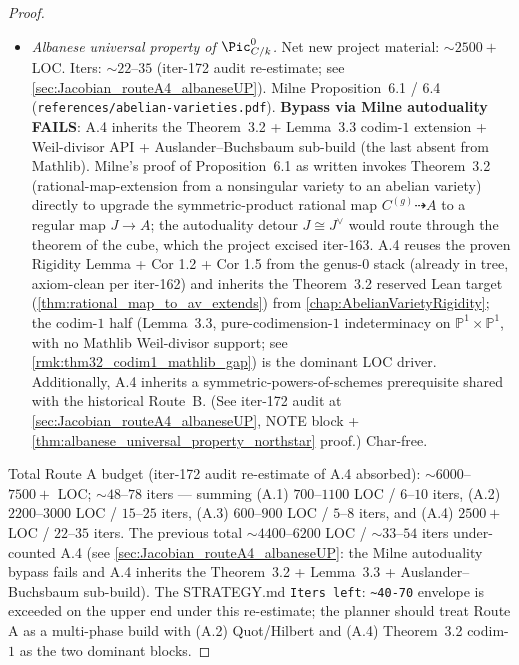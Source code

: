 \begin{proof}
\begin{itemize}
      of (A.2).
    \item[(A.4)] \emph{Albanese universal property of \(\Pic^0_{C/k}\).}
      Net new project material: \(\sim 2500{+}\) LOC. Iters: \(\sim 22\)--\(35\)
      (iter-172 audit re-estimate; see
      \cref{sec:Jacobian_routeA4_albaneseUP}).
      Milne Proposition~6.1 / 6.4 (\texttt{references/abelian-varieties.pdf}).
      \textbf{Bypass via Milne autoduality FAILS}: A.4 inherits the
      Theorem~3.2 + Lemma~3.3 codim-\(1\) extension + Weil-divisor API +
      Auslander--Buchsbaum sub-build (the last absent from Mathlib). Milne's
      proof of Proposition~6.1 as written invokes Theorem~3.2
      (rational-map-extension from a nonsingular variety to an abelian
      variety) directly to upgrade the symmetric-product rational map
      \(C^{(g)} \dashrightarrow A\) to a regular map \(J \to A\); the
      autoduality detour \(J \cong J^\vee\) would route through the theorem
      of the cube, which the project excised iter-163. A.4 reuses the
      proven Rigidity Lemma + Cor 1.2 + Cor 1.5 from the genus-\(0\) stack
      (already in tree, axiom-clean per iter-162) and inherits the
      Theorem~3.2 reserved Lean target
      (\cref{thm:rational_map_to_av_extends}) from
      \cref{chap:AbelianVarietyRigidity}; the codim-\(1\) half (Lemma~3.3,
      pure-codimension-\(1\) indeterminacy on \(\mathbb P^1 \times \mathbb P^1\),
      with no Mathlib Weil-divisor support; see
      \cref{rmk:thm32_codim1_mathlib_gap}) is the dominant LOC driver.
      Additionally, A.4 inherits a symmetric-powers-of-schemes prerequisite
      shared with the historical Route~B. (See iter-172 audit at
      \cref{sec:Jacobian_routeA4_albaneseUP}, NOTE block +
      \cref{thm:albanese_universal_property_northstar} proof.) Char-free.
  \end{itemize}
  Total Route A budget (iter-172 audit re-estimate of A.4 absorbed):
  \(\sim 6000\)--\(7500{+}\) LOC; \(\sim 48\)--\(78\) iters --- summing
  (A.1) \(700\)--\(1100\) LOC / \(6\)--\(10\) iters, (A.2) \(2200\)--\(3000\) LOC /
  \(15\)--\(25\) iters, (A.3) \(600\)--\(900\) LOC / \(5\)--\(8\) iters, and (A.4)
  \(2500{+}\) LOC / \(22\)--\(35\) iters. The previous total \(\sim 4400\)--\(6200\)
  LOC / \(\sim 33\)--\(54\) iters under-counted A.4 (see
  \cref{sec:Jacobian_routeA4_albaneseUP}: the Milne autoduality bypass
  fails and A.4 inherits the Theorem~3.2 + Lemma~3.3 + Auslander--Buchsbaum
  sub-build). The STRATEGY.md \texttt{Iters left}: \texttt{\textasciitilde 40-70}
  envelope is exceeded on the upper end under this re-estimate; the planner
  should treat Route A as a multi-phase build with (A.2) Quot/Hilbert and
  (A.4) Theorem~3.2 codim-\(1\) as the two dominant blocks.

\end{proof}
